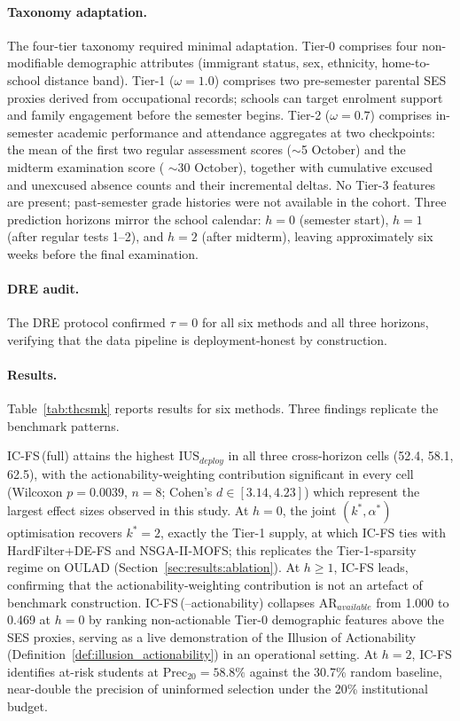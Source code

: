 \documentclass[a4paper,fleqn]{cas-sc}
\begin{document}
\paragraph{Taxonomy adaptation.}
The four-tier taxonomy required minimal adaptation. Tier-0 comprises four non-modifiable demographic attributes (immigrant status, sex, ethnicity, home-to-school distance band). Tier-1 ($\omega=1.0$) comprises two pre-semester parental SES proxies derived from occupational records; schools can target enrolment support
and family engagement before the semester begins. Tier-2 ($\omega=0.7$) comprises in-semester academic performance and attendance aggregates at two checkpoints: the mean of the first two regular assessment scores ($\sim$5 October) and the midterm examination score ( $\sim$30 October), together with cumulative excused and unexcused
absence counts and their incremental deltas. No Tier-3 features are present; past-semester grade histories were not available in the cohort. Three prediction horizons mirror the school calendar: $h=0$ (semester start), $h=1$ (after regular tests 1--2), and $h=2$ (after midterm), leaving approximately six weeks before the final examination.
 
\paragraph{DRE audit.}
The DRE protocol confirmed $\tau = 0$ for all six methods and all three horizons, verifying that the data pipeline is deployment-honest by construction.
 
\paragraph{Results.}
Table~\ref{tab:thcsmk} reports results for six methods.
Three findings replicate the benchmark patterns.
 
IC-FS\,(full) attains the highest $\mathrm{IUS}_{deploy}$ in all three cross-horizon cells (52.4, 58.1, 62.5), with the actionability-weighting contribution significant in every cell (Wilcoxon $p=0.0039$, $n=8$; Cohen's $d \in [3.14, 4.23]$) which represent the largest effect sizes observed in this study. At $h=0$, the joint $(k^*, \alpha^*)$ optimisation recovers $k^*=2$, exactly the Tier-1 supply, at which IC-FS ties with HardFilter+DE-FS and NSGA-II-MOFS; this replicates the Tier-1-sparsity regime on OULAD (Section~\ref{sec:results:ablation}). At $h \geq 1$, IC-FS leads, confirming that the actionability-weighting contribution is not an artefact of benchmark construction. IC-FS\,(--actionability) collapses $\mathrm{AR}_{available}$ from 1.000 to 0.469 at $h=0$ by ranking non-actionable Tier-0 demographic features above the SES proxies, serving as a live demonstration of the Illusion of Actionability (Definition~\ref{def:illusion_actionability}) in an operational setting. At $h=2$, IC-FS identifies at-risk students at $\mathrm{Prec}_{20} = 58.8\%$ against the 30.7\% random baseline, near-double the precision of uninformed selection under the 20\%
institutional budget.
 
\end{document}
